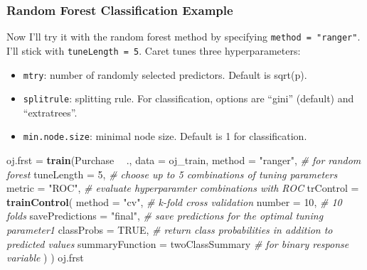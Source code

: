 \documentclass[]{book}
\newenvironment{Shaded}{\begin{snugshade}}{\end{snugshade}}
\newcommand{\CommentTok}[1]{\textcolor[rgb]{0.56,0.35,0.01}{\textit{#1}}}
\newcommand{\DataTypeTok}[1]{\textcolor[rgb]{0.13,0.29,0.53}{#1}}
\newcommand{\DecValTok}[1]{\textcolor[rgb]{0.00,0.00,0.81}{#1}}
\newcommand{\KeywordTok}[1]{\textcolor[rgb]{0.13,0.29,0.53}{\textbf{#1}}}
\newcommand{\NormalTok}[1]{#1}
\newcommand{\OperatorTok}[1]{\textcolor[rgb]{0.81,0.36,0.00}{\textbf{#1}}}
\newcommand{\OtherTok}[1]{\textcolor[rgb]{0.56,0.35,0.01}{#1}}
\newcommand{\StringTok}[1]{\textcolor[rgb]{0.31,0.60,0.02}{#1}}
\providecommand{\tightlist}{%
  \setlength{\itemsep}{0pt}\setlength{\parskip}{0pt}}
\begin{document}
\hypertarget{random-forest-classification-example}{%
\subsubsection{Random Forest Classification Example}\label{random-forest-classification-example}}

Now I'll try it with the random forest method by specifying \texttt{method\ =\ "ranger"}. I'll stick with \texttt{tuneLength\ =\ 5}. Caret tunes three hyperparameters:

\begin{itemize}
\tightlist
\item
  \texttt{mtry}: number of randomly selected predictors. Default is sqrt(p).
\item
  \texttt{splitrule}: splitting rule. For classification, options are ``gini'' (default) and ``extratrees''.
\item
  \texttt{min.node.size}: minimal node size. Default is 1 for classification.
\end{itemize}

\begin{Shaded}
\begin{Highlighting}[]
\NormalTok{oj.frst =}\StringTok{ }\KeywordTok{train}\NormalTok{(Purchase }\OperatorTok{~}\StringTok{ }\NormalTok{., }
               \DataTypeTok{data =}\NormalTok{ oj_train, }
               \DataTypeTok{method =} \StringTok{"ranger"}\NormalTok{,  }\CommentTok{# for random forest}
               \DataTypeTok{tuneLength =} \DecValTok{5}\NormalTok{,  }\CommentTok{# choose up to 5 combinations of tuning parameters}
               \DataTypeTok{metric =} \StringTok{"ROC"}\NormalTok{,  }\CommentTok{# evaluate hyperparamter combinations with ROC}
               \DataTypeTok{trControl =} \KeywordTok{trainControl}\NormalTok{(}
                 \DataTypeTok{method =} \StringTok{"cv"}\NormalTok{,  }\CommentTok{# k-fold cross validation}
                 \DataTypeTok{number =} \DecValTok{10}\NormalTok{,  }\CommentTok{# 10 folds}
                 \DataTypeTok{savePredictions =} \StringTok{"final"}\NormalTok{,       }\CommentTok{# save predictions for the optimal tuning parameter1}
                 \DataTypeTok{classProbs =} \OtherTok{TRUE}\NormalTok{,  }\CommentTok{# return class probabilities in addition to predicted values}
                 \DataTypeTok{summaryFunction =}\NormalTok{ twoClassSummary  }\CommentTok{# for binary response variable}
\NormalTok{                 )}
\NormalTok{               )}
\NormalTok{oj.frst}
\end{Highlighting}
\end{Shaded}
\end{document}
